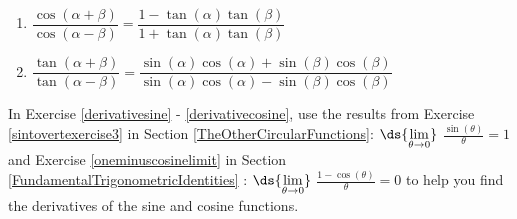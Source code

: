 \documentclass{ximera}
\begin{document}
\begin{multicols}{2}

\begin{enumerate}

\setcounter{enumi}{\value{HW}}

\item $\dfrac{\cos(\alpha + \beta)}{\cos(\alpha - \beta)} = \dfrac{1 - \tan(\alpha)\tan(\beta)}{1 + \tan(\alpha)\tan(\beta)}$
\item $\dfrac{\tan(\alpha + \beta)}{\tan(\alpha - \beta)} = \dfrac{\sin(\alpha)\cos(\alpha) + \sin(\beta)\cos(\beta)}{\sin(\alpha)\cos(\alpha) - \sin(\beta)\cos(\beta)}$\label{identlastident}

\setcounter{HW}{\value{enumi}}

\end{enumerate}
\end{multicols}

\pagebreak

In Exercise \ref{derivativesine} - \ref{derivativecosine}, use the results from  Exercise \ref{sintovertexercise3} in Section \ref{TheOtherCircularFunctions}: $\ds{\lim_{\theta \rightarrow 0}}$ $\frac{\sin(\theta)}{\theta} = 1$ and Exercise \ref{oneminuscosinelimit} in Section \ref{FundamentalTrigonometricIdentities} :   $\ds{\lim_{\theta \rightarrow 0}}$ $\frac{1 - \cos(\theta)}{\theta} = 0$ to help you find the derivatives of the sine and cosine functions.
\end{document}
